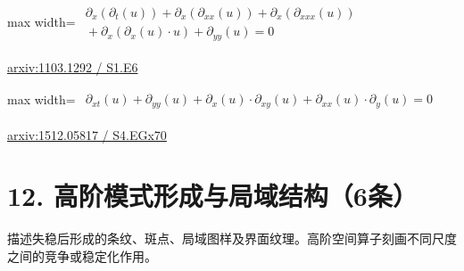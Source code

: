 \documentclass[UTF8,10pt,a4paper,fontset=mac]{ctexart}
\begin{document}
\begin{minipage}{\linewidth}\begin{center}\begin{adjustbox}{max width=\linewidth}$\displaystyle\begin{gathered}\begin{gathered}\partial_{x}(\partial_{t}(u))+\partial_{x}(\partial_{xx}(u))+\partial_{x}(\partial_{xxx}(u))\\[-1pt]{}+\partial_{x}(\partial_{x}(u)\cdot u)+\partial_{yy}(u)=0\end{gathered}\end{gathered}$\end{adjustbox}\end{center}{\small\href{https://arxiv.org/html/1103.1292#S1.E6}{arxiv:1103.1292 / S1.E6}}\par\end{minipage}\par\vspace{6mm}

\begin{minipage}{\linewidth}\begin{center}\begin{adjustbox}{max width=\linewidth}$\displaystyle\begin{gathered}\begin{gathered}\partial_{xt}(u)+\partial_{yy}(u)+\partial_{x}(u)\cdot \partial_{xy}(u)+\partial_{xx}(u)\cdot \partial_{y}(u)=0\end{gathered}\end{gathered}$\end{adjustbox}\end{center}{\small\href{https://arxiv.org/html/1512.05817#S4.EGx70}{arxiv:1512.05817 / S4.EGx70}}\par\end{minipage}\par\vspace{6mm}

\section*{12. 高阶模式形成与局域结构（6条）}
描述失稳后形成的条纹、斑点、局域图样及界面纹理。高阶空间算子刻画不同尺度之间的竞争或稳定化作用。\par\medskip
\end{document}
